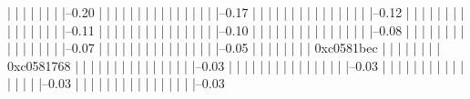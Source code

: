             |          |          |          |          |          |          |          |--0.20%
            |          |          |          |          |          |          |          |          
            |          |          |          |          |          |          |          |--0.17%
            |          |          |          |          |          |          |          |          
            |          |          |          |          |          |          |          |--0.12%
            |          |          |          |          |          |          |          |          
            |          |          |          |          |          |          |          |--0.11%
            |          |          |          |          |          |          |          |          
            |          |          |          |          |          |          |          |--0.10%
            |          |          |          |          |          |          |          |          
            |          |          |          |          |          |          |          |--0.08%
            |          |          |          |          |          |          |          |          
            |          |          |          |          |          |          |          |--0.07%
            |          |          |          |          |          |          |          |          
            |          |          |          |          |          |          |          |--0.05%
            |          |          |          |          |          |          |          |          0xc0581bec
            |          |          |          |          |          |          |          |          0xc0581768
            |          |          |          |          |          |          |          |          
            |          |          |          |          |          |          |          |--0.03%
            |          |          |          |          |          |          |          |          
            |          |          |          |          |          |          |          |--0.03%
            |          |          |          |          |          |          |          |          
            |          |          |          |          |          |          |          |--0.03%
            |          |          |          |          |          |          |          |          
            |          |          |          |          |          |          |          |--0.03%

